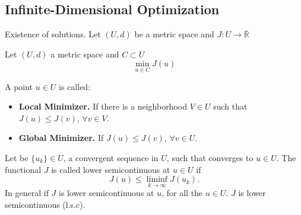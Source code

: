 \subsection{Infinite-Dimensional Optimization}
Existence of solutions. Let $(U,d)$ be a metric space and $J:U\rightarrow \overline{\mathbb{R}}$

Let $(U, d)$ a metric space and $C\subset U$
\[
	\min_{u\in C} J(u)
\]


\begin{definition}
	A point $u\in U$ is called:
	\begin{itemize}
		\item \textbf{Local Minimizer.} If there is a neighborhood $V \in U$ such that $J(u) \leq J(v)$, $\forall v \in V$.
		\item \textbf{Global Minimizer. } If $J(u)\leq J(v)$, $\forall v \in U$.
	\end{itemize}
\end{definition}
\begin{definition}
	Let be $\{u_k\} \in U$, a convergent sequence in $U$, such that converges to $u \in U$. The functional $J$ is called lower semicontinuous at $u\in U$ if
	\[
		J(u) \leq \liminf_{k\rightarrow\infty} J(u_k).
	\]
	In general if $J$ is lower semicontinuous at $u$, for all the $u \in U$. $J$ is lower semicontinuous (l.s.c). 
\end{definition}

